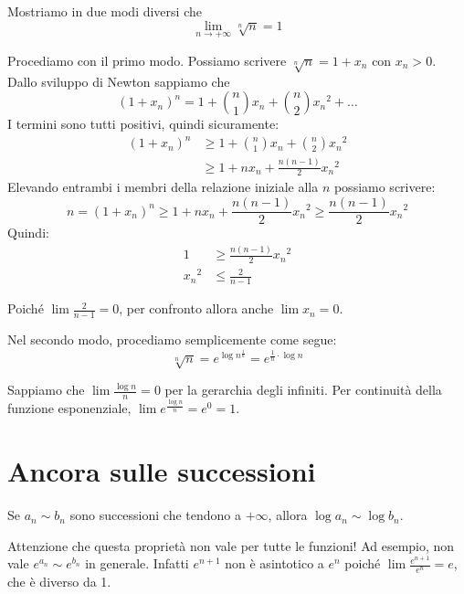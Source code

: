 \begin{example}
Mostriamo in due modi diversi che
\begin{equation*}
\lim_{n \to +\infty} \sqrt[n]{n} = 1
\end{equation*}

Procediamo con il primo modo. Possiamo scrivere $\sqrt[n]{n} = 1 + x_n$ con $x_n > 0$. Dallo sviluppo di Newton sappiamo che
\begin{equation*}
(1+x_n)^n = 1 + \binom{n}{1}x_n + \binom{n}{2} {x_n}^2 + \ldots
\end{equation*}
I termini sono tutti positivi, quindi sicuramente:
\begin{align*}
(1+x_n)^n &\ge 1 + \binom{n}{1}x_n + \binom{n}{2} {x_n}^2 \\
&\ge 1 + nx_n + \frac{n(n-1)}{2} {x_n}^2
\end{align*}
Elevando entrambi i membri della relazione iniziale alla $n$ possiamo scrivere:
\begin{equation*}
n = (1+x_n)^n \ge 1 + nx_n + \frac{n(n-1)}{2} {x_n}^2 \ge \frac{n(n-1)}{2} {x_n}^2
\end{equation*}
Quindi:
\begin{align*}
1 &\ge \frac{n(n-1)}{2} {x_n}^2 \\
{x_n}^2 &\le \frac{2}{n-1}
\end{align*}

Poiché $\lim \frac{2}{n-1} = 0$, per confronto allora anche $\lim x_n = 0$.

Nel secondo modo, procediamo semplicemente come segue:
\begin{equation*}
\sqrt[n]{n} = e^{\log n^{\frac{1}{n}}} = e^{\frac{1}{n} \cdot \log n}
\end{equation*}

Sappiamo che $\lim \frac{\log n}{n} = 0$ per la gerarchia degli infiniti. Per continuità della funzione esponenziale, $\lim e^\frac{\log n}{n} = e^0 = 1$.
\end{example}

\section{Ancora sulle successioni}
\begin{remark}
Se $a_n \sim b_n$ sono successioni che tendono a $+\infty$, allora $\log a_n \sim \log b_n$.
\end{remark}

Attenzione che questa proprietà non vale per tutte le funzioni! Ad esempio, non vale $e^{a_n} \sim e^{b_n}$ in generale. Infatti $e^{n+1}$ non è asintotico a $e^n$ poiché $\lim \frac{e^{n+1}}{e^n} = e$, che è diverso da 1.

